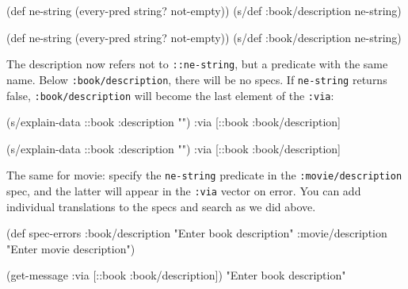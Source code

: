 \ifx\DEVICETYPE\MOBILE

\begin{english}
  \begin{clojure}
(def ne-string
  (every-pred string? not-empty))
(s/def :book/description ne-string)
  \end{clojure}
\end{english}

\else

\begin{english}
  \begin{clojure}
(def ne-string (every-pred string? not-empty))
(s/def :book/description ne-string)
  \end{clojure}
\end{english}

\fi

\mnoindent
The description now refers not to \verb|::ne-string|, but a predicate with the same name. Below \verb|:book/description|, there will be no specs. If \verb|ne-string| returns false, \verb|:book/description| will become the last element of the \verb|:via|:

\ifx\DEVICETYPE\MOBILE

\begin{english}
  \begin{clojure}
(s/explain-data ::book
  {:description ""})
{:via [::book :book/description]}
  \end{clojure}
\end{english}

\else

\begin{english}
  \begin{clojure}
(s/explain-data ::book {:description ""})
{:via [::book :book/description]}
  \end{clojure}
\end{english}

\fi

The same for movie: specify the \verb|ne-string| predicate in the \verb|:movie/description| spec, and the latter will appear in the \verb|:via| vector on error. You can add individual translations to the specs and search as we did above.

\ifx\DEVICETYPE\MOBILE

 \begin{clojure}
(def spec-errors
  {:book/description
   "Enter book description"
   :movie/description
   "Enter movie description"})

(get-message
  {:via [::book :book/description]})
"Enter book description"
  \end{clojure}

